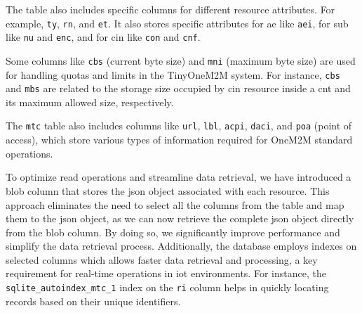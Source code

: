 \documentclass[a4paper,fleqn]{cas-dc}
\begin{document}
The table also includes specific columns for different resource attributes. For example, \texttt{ty}, \texttt{rn}, and \texttt{et}. It also stores specific attributes for \gls{ae} like \texttt{aei}, for \gls{sub} like \texttt{nu} and \texttt{enc}, and for \gls{cin} like \texttt{con} and \texttt{cnf}.

Some columns like \texttt{cbs} (current byte size) and \texttt{mni} (maximum byte size) are used for handling quotas and limits in the TinyOneM2M system. For instance, \texttt{cbs} and \texttt{mbs} are related to the storage size occupied by \gls{cin} resource inside a \gls{cnt} and its maximum allowed size, respectively.

The \texttt{mtc} table also includes columns like \texttt{url}, \texttt{lbl}, \texttt{acpi}, \texttt{daci}, and \texttt{poa} (point of access), which store various types of information required for OneM2M standard operations.

To optimize read operations and streamline data retrieval, we have introduced a blob column that stores the \gls{json} object associated with each resource. This approach eliminates the need to select all the columns from the table and map them to the \gls{json} object, as we can now retrieve the complete \gls{json} object directly from the blob column. By doing so, we significantly improve performance and simplify the data retrieval process. Additionally, the database employs indexes on selected columns which allows faster data retrieval and processing, a key requirement for real-time operations in \gls{iot} environments. For instance, the \texttt{sqlite\_autoindex\_mtc\_1} index on the \texttt{ri} column helps in quickly locating records based on their unique identifiers.
\end{document}
